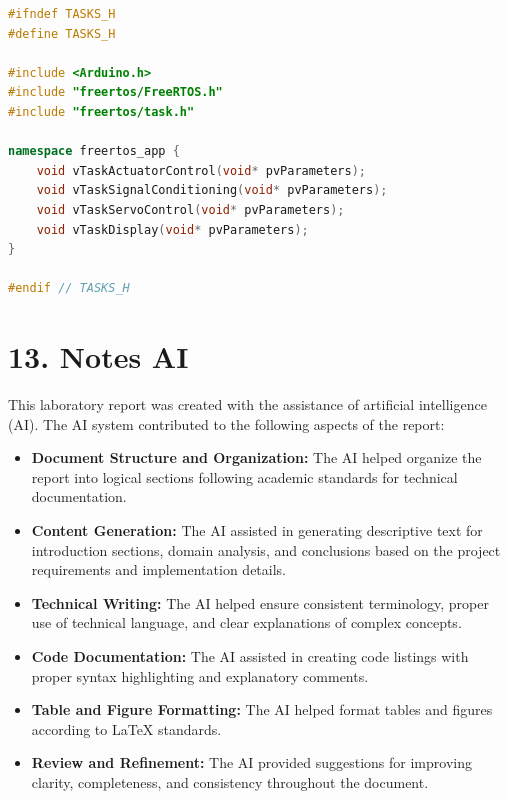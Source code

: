 \documentclass[12pt]{article}
\begin{document}
\begin{lstlisting}[language=C++, caption=tasks.h - Task Interface]
#ifndef TASKS_H
#define TASKS_H

#include <Arduino.h>
#include "freertos/FreeRTOS.h"
#include "freertos/task.h"

namespace freertos_app {
    void vTaskActuatorControl(void* pvParameters);
    void vTaskSignalConditioning(void* pvParameters);
    void vTaskServoControl(void* pvParameters);
    void vTaskDisplay(void* pvParameters);
}

#endif // TASKS_H
\end{lstlisting}

\section*{13. Notes AI}

This laboratory report was created with the assistance of artificial intelligence (AI). The AI system contributed to the following aspects of the report:

\begin{itemize}
    \item \textbf{Document Structure and Organization:} The AI helped organize the report into logical sections following academic standards for technical documentation.

    \item \textbf{Content Generation:} The AI assisted in generating descriptive text for introduction sections, domain analysis, and conclusions based on the project requirements and implementation details.

    \item \textbf{Technical Writing:} The AI helped ensure consistent terminology, proper use of technical language, and clear explanations of complex concepts.

    \item \textbf{Code Documentation:} The AI assisted in creating code listings with proper syntax highlighting and explanatory comments.

    \item \textbf{Table and Figure Formatting:} The AI helped format tables and figures according to LaTeX standards.

    \item \textbf{Review and Refinement:} The AI provided suggestions for improving clarity, completeness, and consistency throughout the document.
\end{itemize}
\end{document}
